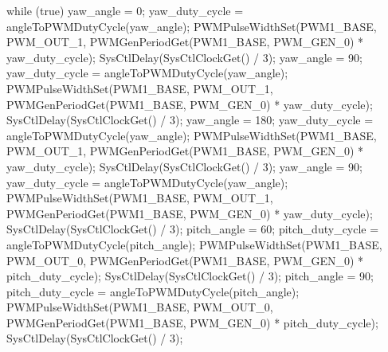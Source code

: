 \documentclass[12pt, a4paper]{article}
\begin{document}
\begin{code}
{    while (true)
    {
        yaw_angle = 0;
        yaw_duty_cycle = angleToPWMDutyCycle(yaw_angle);
        PWMPulseWidthSet(PWM1_BASE, PWM_OUT_1, PWMGenPeriodGet(PWM1_BASE, PWM_GEN_0) * yaw_duty_cycle);
        SysCtlDelay(SysCtlClockGet() / 3);
        yaw_angle = 90;
        yaw_duty_cycle = angleToPWMDutyCycle(yaw_angle);
        PWMPulseWidthSet(PWM1_BASE, PWM_OUT_1, PWMGenPeriodGet(PWM1_BASE, PWM_GEN_0) * yaw_duty_cycle);
        SysCtlDelay(SysCtlClockGet() / 3);
        yaw_angle = 180;
        yaw_duty_cycle = angleToPWMDutyCycle(yaw_angle);
        PWMPulseWidthSet(PWM1_BASE, PWM_OUT_1, PWMGenPeriodGet(PWM1_BASE, PWM_GEN_0) * yaw_duty_cycle);
        SysCtlDelay(SysCtlClockGet() / 3);
        yaw_angle = 90;
        yaw_duty_cycle = angleToPWMDutyCycle(yaw_angle);
        PWMPulseWidthSet(PWM1_BASE, PWM_OUT_1, PWMGenPeriodGet(PWM1_BASE, PWM_GEN_0) * yaw_duty_cycle);
        SysCtlDelay(SysCtlClockGet() / 3);
        pitch_angle = 60;
        pitch_duty_cycle = angleToPWMDutyCycle(pitch_angle);
        PWMPulseWidthSet(PWM1_BASE, PWM_OUT_0, PWMGenPeriodGet(PWM1_BASE, PWM_GEN_0) * pitch_duty_cycle);
        SysCtlDelay(SysCtlClockGet() / 3);
        pitch_angle = 90;
        pitch_duty_cycle = angleToPWMDutyCycle(pitch_angle);
        PWMPulseWidthSet(PWM1_BASE, PWM_OUT_0, PWMGenPeriodGet(PWM1_BASE, PWM_GEN_0) * pitch_duty_cycle);
        SysCtlDelay(SysCtlClockGet() / 3);
    }
}
\end{code}
\end{document}
